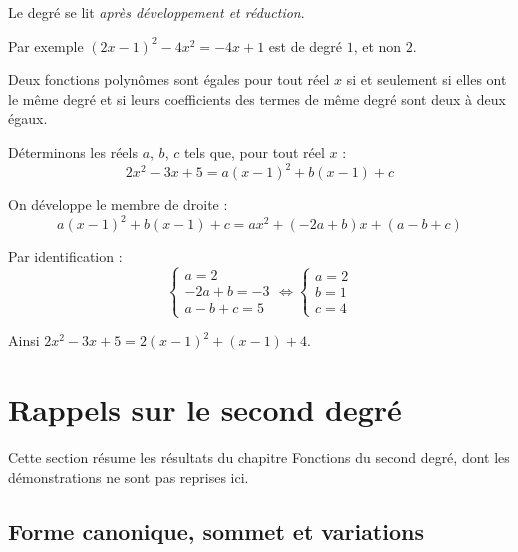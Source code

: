 \begin{attention}
	Le degré se lit \emph{après développement et réduction}.

	Par exemple $(2x-1)^2 - 4x^2 = -4x + 1$ est de degré $1$, et non $2$.
\end{attention}

\begin{prop}
	Deux fonctions polynômes sont égales pour tout réel $x$ si et seulement si elles ont le même degré et si leurs coefficients des termes de même degré sont deux à deux égaux.
\end{prop}

\begin{ex}
	Déterminons les réels $a$, $b$, $c$ tels que, pour tout réel $x$ :
	\[
		2x^2 - 3x + 5 = a(x-1)^2 + b(x-1) + c
	\]

	On développe le membre de droite :
	\[
		a(x-1)^2 + b(x-1) + c = ax^2 + (-2a + b)x + (a - b + c)
	\]

	Par identification :
	\[
		\begin{cases}
			a = 2        \\
			-2a + b = -3 \\
			a - b + c = 5
		\end{cases}
		\iff
		\begin{cases}
			a = 2 \\
			b = 1 \\
			c = 4
		\end{cases}
	\]

	Ainsi $2x^2 - 3x + 5 = 2(x-1)^2 + (x-1) + 4$.
\end{ex}

\section{Rappels sur le second degré}

Cette section résume les résultats du chapitre \og Fonctions du second degré\fg{}, dont les démonstrations ne sont pas reprises ici.

\subsection{Forme canonique, sommet et variations}

